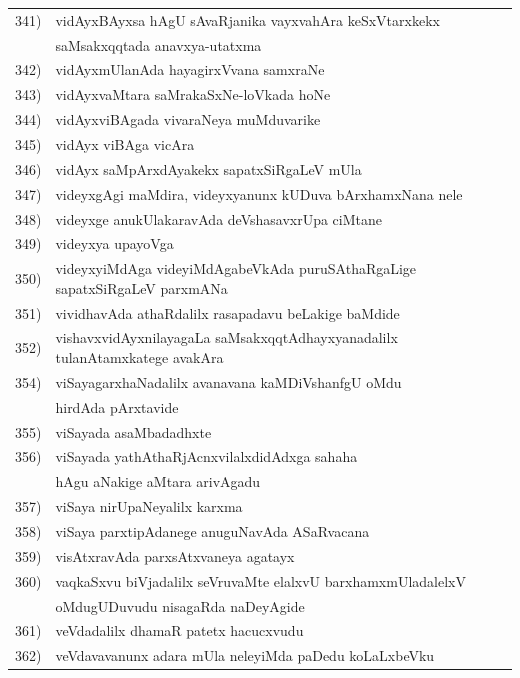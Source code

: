 \begin{longtable}{@{}cp{7.4cm}r}
341) & vidAyxBAyxsa hAgU sAvaRjanika vayxvahAra keSxVtarxkekx & \\
     & saMsakxqqtada anavxya-utatxma & \pageref{page36}\\ 
342) & vidAyxmUlanAda hayagirxVvana samxraNe & \pageref{page19a}\\
343) & vidAyxvaMtara saMrakaSxNe-loVkada hoNe & \pageref{page50c}\\
344) & vidAyxviBAgada vivaraNeya muMduvarike & \pageref{90c}\\
345) & vidAyx viBAga vicAra & \pageref{page89a}\\ 
346) & vidAyx saMpArxdAyakekx sapatxSiRgaLeV mUla & \pageref{page88}\\
347) & videyxgAgi maMdira, videyxyanunx kUDuva bArxhamxNana nele & \pageref{page86a}\\
348) & videyxge anukUlakaravAda deVshasavxrUpa ciMtane & \pageref{page93}\\
349) & videyxya upayoVga & \pageref{page86}\\
350) & videyxyiMdAga videyiMdAgabeVkAda puruSAthaRgaLige sapatxSiRgaLeV parxmANa &  \pageref{page89}\\
351) & vividhavAda athaRdalilx rasapadavu beLakige baMdide & \pageref{page217}\\
352) & vishavxvidAyxnilayagaLa saMsakxqqtAdhayxyanadalilx tulanAtamxkatege avakAra & \pageref{page44a}\\
354) & viSayagarxhaNadalilx avanavana kaMDiVshanfgU oMdu & \\
     & hirdAda pArxtavide & \pageref{page219a}\\
355) &  viSayada asaMbadadhxte & \pageref{page115}\\
356) & viSayada yathAthaRjAcnxvilalxdidAdxga sahaha & \\
     & hAgu aNakige aMtara arivAgadu & \pageref{page194}\\
357) & viSaya nirUpaNeyalilx karxma & \pageref{page131a}\\
358) & viSaya parxtipAdanege anuguNavAda ASaRvacana & \pageref{page128}\\
359) & visAtxravAda parxsAtxvaneya agatayx & \pageref{page27a}\\ 
360) & vaqkaSxvu biVjadalilx seVruvaMte elalxvU barxhamxmUladalelxV & \\
     & oMdugUDuvudu nisagaRda naDeyAgide & \pageref{page247}\\
361) & veVdadalilx dhamaR patetx hacucxvudu & \pageref{page124a}\\
362) & veVdavavanunx adara mUla neleyiMda paDedu koLaLxbeVku & \pageref{page135}\\

\end{longtable}
